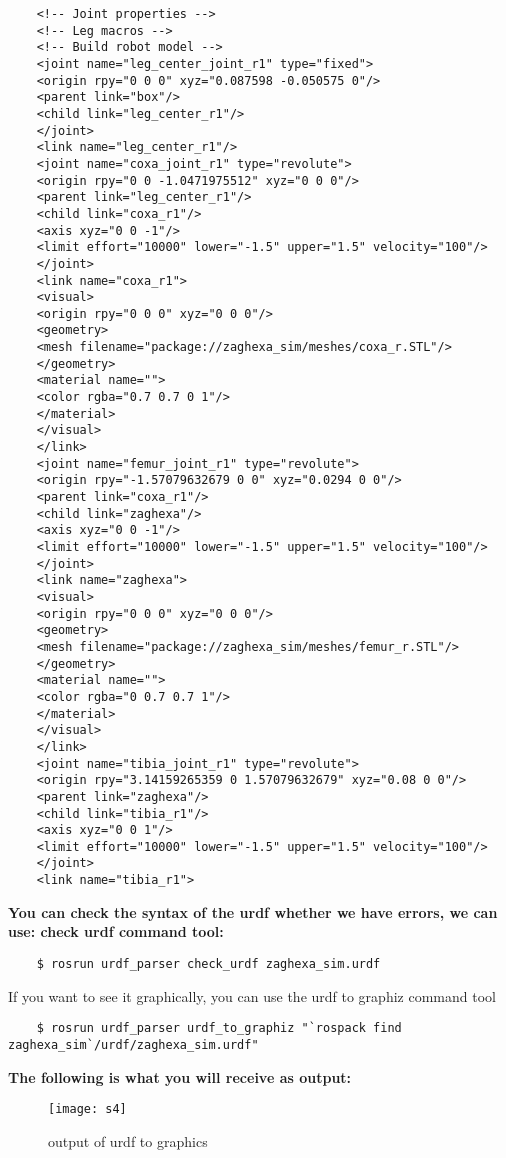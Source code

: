 	\begin{lstlisting}
	<!-- Joint properties -->
	<!-- Leg macros -->
	<!-- Build robot model -->
	<joint name="leg_center_joint_r1" type="fixed">
	<origin rpy="0 0 0" xyz="0.087598 -0.050575 0"/>
	<parent link="box"/>
	<child link="leg_center_r1"/>
	</joint>
	<link name="leg_center_r1"/>
	<joint name="coxa_joint_r1" type="revolute">
	<origin rpy="0 0 -1.0471975512" xyz="0 0 0"/>
	<parent link="leg_center_r1"/>
	<child link="coxa_r1"/>
	<axis xyz="0 0 -1"/>
	<limit effort="10000" lower="-1.5" upper="1.5" velocity="100"/>
	</joint>
	<link name="coxa_r1">
	<visual>
	<origin rpy="0 0 0" xyz="0 0 0"/>
	<geometry>
	<mesh filename="package://zaghexa_sim/meshes/coxa_r.STL"/>
	</geometry>
	<material name="">
	<color rgba="0.7 0.7 0 1"/>
	</material>
	</visual>
	</link>
	<joint name="femur_joint_r1" type="revolute">
	<origin rpy="-1.57079632679 0 0" xyz="0.0294 0 0"/>
	<parent link="coxa_r1"/>
	<child link="zaghexa"/>
	<axis xyz="0 0 -1"/>
	<limit effort="10000" lower="-1.5" upper="1.5" velocity="100"/>
	</joint>
	<link name="zaghexa">
	<visual>
	<origin rpy="0 0 0" xyz="0 0 0"/>
	<geometry>
	<mesh filename="package://zaghexa_sim/meshes/femur_r.STL"/>
	</geometry>
	<material name="">
	<color rgba="0 0.7 0.7 1"/>
	</material>
	</visual>
	</link>
	<joint name="tibia_joint_r1" type="revolute">
	<origin rpy="3.14159265359 0 1.57079632679" xyz="0.08 0 0"/>
	<parent link="zaghexa"/>
	<child link="tibia_r1"/>
	<axis xyz="0 0 1"/>
	<limit effort="10000" lower="-1.5" upper="1.5" velocity="100"/>
	</joint>
	<link name="tibia_r1">
	\end{lstlisting}
	\textbf{You can check the syntax of the urdf whether we have errors, we can use:
		check urdf command tool:}
	\begin{lstlisting}
	$ rosrun urdf_parser check_urdf zaghexa_sim.urdf
	\end{lstlisting}
	If you want to see it graphically, you can use the urdf to graphiz command tool
	\begin{lstlisting}
	$ rosrun urdf_parser urdf_to_graphiz "`rospack find zaghexa_sim`/urdf/zaghexa_sim.urdf"
	\end{lstlisting}
	\textbf{The following is what you will receive as output:}
	
	\begin{figure}[h]
		\centering
		\texttt{[image: s4]}
		\caption{output of urdf to graphics}
		\label{figure :s4}
	\end{figure}
	
